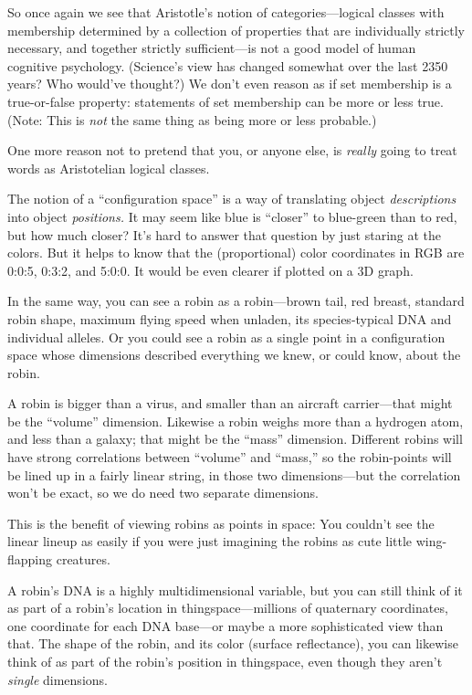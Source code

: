 {
 So once again we see that Aristotle's notion of
categories---logical classes with membership determined by a collection
of properties that are individually strictly necessary, and together
strictly sufficient---is not a good model of human cognitive
psychology. (Science's view has changed somewhat over
the last 2350 years? Who would've thought?) We
don't even reason as if set membership is a
true-or-false property: statements of set membership can be more or
less true. (Note: This is \textit{not} the same thing as being more or
less probable.)}

{
 One more reason not to pretend that you, or anyone else, is
\textit{really} going to treat words as Aristotelian logical classes.}

\myendsectiontext


\bigskip


{
 The notion of a ``configuration
space'' is a way of translating object
\textit{descriptions} into object \textit{positions.} It may seem like
blue is ``closer'' to blue-green
than to red, but how much closer? It's hard to answer
that question by just staring at the colors. But it helps to know that
the (proportional) color coordinates in RGB are 0:0:5, 0:3:2, and
5:0:0. It would be even clearer if plotted on a 3D graph.}

{
 In the same way, you can see a robin as a robin---brown tail, red
breast, standard robin shape, maximum flying speed when unladen, its
species-typical DNA and individual alleles. Or you could see a robin as
a single point in a configuration space whose dimensions described
everything we knew, or could know, about the robin.}

{
 A robin is bigger than a virus, and smaller than an aircraft
carrier---that might be the
``volume'' dimension. Likewise a
robin weighs more than a hydrogen atom, and less than a galaxy; that
might be the ``mass'' dimension.
Different robins will have strong correlations between
``volume'' and
``mass,'' so the robin-points will
be lined up in a fairly linear string, in those two dimensions---but
the correlation won't be exact, so we do need two
separate dimensions.}

{
 This is the benefit of viewing robins as points in space: You
couldn't see the linear lineup as easily if you were
just imagining the robins as cute little wing-flapping creatures.}

{
 A robin's DNA is a highly multidimensional
variable, but you can still think of it as part of a
robin's location in thingspace---millions of quaternary
coordinates, one coordinate for each DNA base---or maybe a more
sophisticated view than that. The shape of the robin, and its color
(surface reflectance), you can likewise think of as part of the
robin's position in thingspace, even though they
aren't \textit{single} dimensions.}

